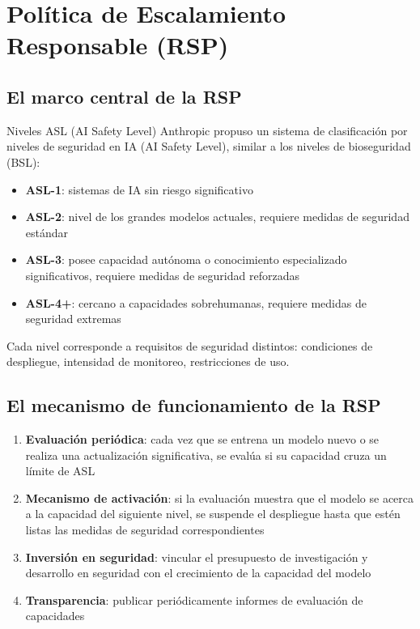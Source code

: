 \section{Política de Escalamiento Responsable (RSP)}

\subsection{El marco central de la RSP}

\begin{importantbox}{Niveles ASL (AI Safety Level)}
Anthropic propuso un sistema de clasificación por niveles de seguridad en IA (AI Safety Level), similar a los niveles de bioseguridad (BSL):
\begin{itemize}
    \item \textbf{ASL-1}: sistemas de IA sin riesgo significativo
    \item \textbf{ASL-2}: nivel de los grandes modelos actuales, requiere medidas de seguridad estándar
    \item \textbf{ASL-3}: posee capacidad autónoma o conocimiento especializado significativos, requiere medidas de seguridad reforzadas
    \item \textbf{ASL-4+}: cercano a capacidades sobrehumanas, requiere medidas de seguridad extremas
\end{itemize}
Cada nivel corresponde a requisitos de seguridad distintos: condiciones de despliegue, intensidad de monitoreo, restricciones de uso.
\end{importantbox}

\subsection{El mecanismo de funcionamiento de la RSP}

\begin{enumerate}
    \item \textbf{Evaluación periódica}: cada vez que se entrena un modelo nuevo o se realiza una actualización significativa, se evalúa si su capacidad cruza un límite de ASL
    \item \textbf{Mecanismo de activación}: si la evaluación muestra que el modelo se acerca a la capacidad del siguiente nivel, se suspende el despliegue hasta que estén listas las medidas de seguridad correspondientes
    \item \textbf{Inversión en seguridad}: vincular el presupuesto de investigación y desarrollo en seguridad con el crecimiento de la capacidad del modelo
    \item \textbf{Transparencia}: publicar periódicamente informes de evaluación de capacidades
\end{enumerate}

